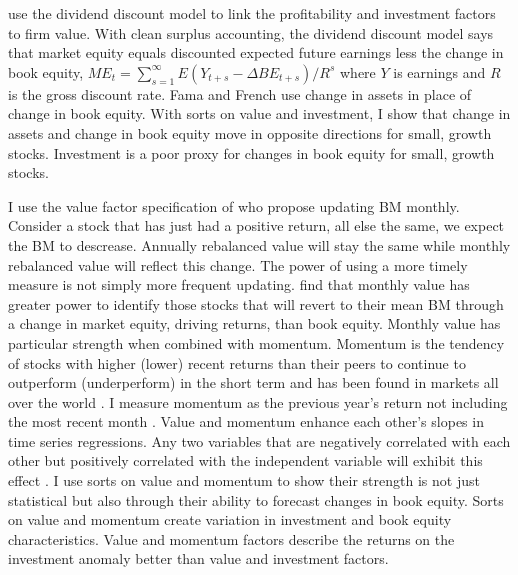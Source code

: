 \textcite{fama2006profitability} use the dividend discount model to link the
profitability and investment factors to firm value.
With clean surplus accounting, the dividend discount model says that market
equity equals discounted expected future earnings less the change in book
equity,
$ME_t = \sum_{s=1}^\infty E(Y_{t+s}-\Delta BE_{t+s})/R^s$
where $Y$ is earnings and $R$ is the gross discount rate.
Fama and French use change in assets in place of change in book equity.
With sorts on value and investment, I show that change in assets and change in
book equity move in opposite directions for small, growth stocks.
Investment is a poor proxy for changes in book equity for small, growth stocks.

I use the value factor specification of \textcite{asness2013devil} who propose
updating BM monthly.
Consider a stock that has just had a positive return, all else the same, we
expect the BM to descrease.
Annually rebalanced value will stay the same while monthly rebalanced value
will reflect this change.
The power of using a more timely measure is not simply more frequent updating.
\textcite{kok2017facts} find that monthly value has greater power to identify
those stocks that will revert to their mean BM through a change in market
equity, driving returns, than book equity.
Monthly value has particular strength when combined with momentum.
Momentum is the tendency of stocks with higher (lower) recent returns than
their peers to continue to outperform (underperform) in the short term
\parencite{jegadeesh1993returns} and has been found in markets all over
the world \parencite{asness2013value}.
I measure momentum as the previous year's return not including the most recent
month \parencite{fama2016dissecting}.
Value and momentum enhance each other's slopes in time series regressions.
Any two variables that are negatively correlated with each other but positively
correlated with the independent variable will exhibit this effect
\parencite{fama2015incremental}.
I use sorts on value and momentum to show their strength is not just
statistical but also through their ability to forecast changes in book equity.
Sorts on value and momentum create variation in investment and book equity
characteristics.
Value and momentum factors describe the returns on the investment anomaly
better than value and investment factors.


